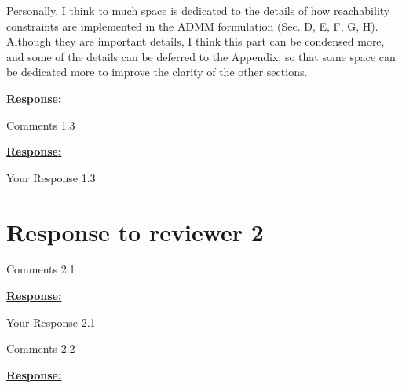 \documentclass{article}
\begin{document}
\begin{cmt}{}{}
	Personally, I think to much space is dedicated to the details of how
	reachability constraints are implemented in the ADMM formulation (Sec.
	D, E, F, G, H). Although they are important details, I think this part
	can be condensed more, and some of the details can be deferred to the
	Appendix, so that some space can be dedicated more to improve the
	clarity of the other sections.
\end{cmt}
\vspace{0.1cm}
\noindent
\underline{\textbf{Response:}}
\vspace{0.2cm}


\vspace{0.3cm}


\begin{cmt}{}{}

Comments 1.3

\end{cmt}
\vspace{0.1cm}
\noindent
\underline{\textbf{Response:}}
\vspace{0.2cm}

Your Response 1.3

\vspace{0.3cm}



\newpage
\section{Response to reviewer 2}

\begin{cmt}{}{}

Comments 2.1

\end{cmt}
\vspace{0.1cm}
\noindent
\underline{\textbf{Response:}}
\vspace{0.2cm}

Your Response 2.1

\vspace{0.3cm}


\begin{cmt}{}{}

Comments 2.2

\end{cmt}
\vspace{0.1cm}
\noindent
\underline{\textbf{Response:}}
\vspace{0.2cm}
\end{document}
